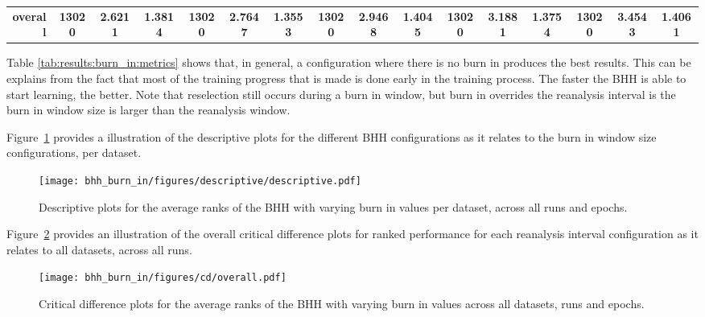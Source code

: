 \begin{table}[H]
{\begin{tabular}{rccccccccccccccc}
			\midrule
			\textbf{overall}                    & \textbf{13020}                       & \cellcolor[rgb]{ .776,  .937,  .808}\textcolor[rgb]{ 0,  .38,  0}{\textbf{2.6211}} & \textbf{1.3814} & \textbf{13020} & \textbf{2.7647}                                                           & \textbf{1.3553} & \textbf{13020} & \textbf{2.9468}                                                           & \textbf{1.4045} & \textbf{13020} & \textbf{3.1881}                                                           & \textbf{1.3754} & \textbf{13020} & \textbf{3.4543} & \textbf{1.4061} \\
		\end{tabular}%
	}
\end{table}%

Table \ref{tab:results:burn_in:metrics} shows that, in general, a configuration where there is no burn in produces the best results. This can be explains from the fact that most of the training progress that is made is done early in the training process. The faster the \acs{BHH} is able to start learning, the better. Note that reselection still occurs during a burn in window, but burn in overrides the reanalysis interval is the burn in window size is larger than the reanalysis window.

Figure~\ref{fig:results:burn_in:descriptive:descriptive} provides a illustration of the descriptive plots for the different \acs{BHH} configurations as it relates to the burn in window size configurations, per dataset.

\begin{figure}[H]
	\centering
	\texttt{[image: bhh\_burn\_in/figures/descriptive/descriptive.pdf]}
	\caption{Descriptive plots for the average ranks of the \acs{BHH} with varying burn in values per dataset, across all runs and epochs.}
	\label{fig:results:burn_in:descriptive:descriptive}
\end{figure}

Figure~\ref{fig:results:burn_in:descriptive:cd} provides an illustration of the overall critical difference plots for ranked performance for each reanalysis interval configuration as it relates to all datasets, across all runs.

\begin{figure}[H]
	\centering
	\texttt{[image: bhh\_burn\_in/figures/cd/overall.pdf]}
	\caption{Critical difference plots for the average ranks of the \acs{BHH} with varying burn in values across all datasets, runs and epochs.}
	\label{fig:results:burn_in:descriptive:cd}
\end{figure}


